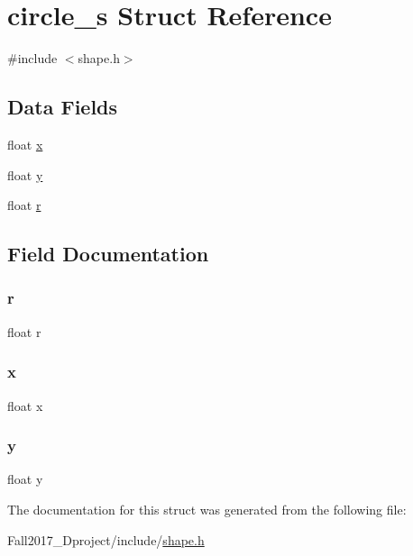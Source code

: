 \hypertarget{structcircle__s}{}\section{circle\+\_\+s Struct Reference}
\label{structcircle__s}


{\ttfamily \#include $<$shape.\+h$>$}

\subsection*{Data Fields}
\begin{DoxyCompactItemize}
\item 
float \hyperlink{structcircle__s_ad0da36b2558901e21e7a30f6c227a45e}{x}
\item 
float \hyperlink{structcircle__s_aa4f0d3eebc3c443f9be81bf48561a217}{y}
\item 
float \hyperlink{structcircle__s_a4788d82c901b9367dd5c0daff8a7616b}{r}
\end{DoxyCompactItemize}


\subsection{Field Documentation}
\mbox{\label{structcircle__s_a4788d82c901b9367dd5c0daff8a7616b}} 
\subsubsection{\texorpdfstring{r}{r}}
{\footnotesize\ttfamily float r}

\mbox{\label{structcircle__s_ad0da36b2558901e21e7a30f6c227a45e}} 
\subsubsection{\texorpdfstring{x}{x}}
{\footnotesize\ttfamily float x}

\mbox{\label{structcircle__s_aa4f0d3eebc3c443f9be81bf48561a217}} 
\subsubsection{\texorpdfstring{y}{y}}
{\footnotesize\ttfamily float y}



The documentation for this struct was generated from the following file\+:\begin{DoxyCompactItemize}
\item 
Fall2017\+\_\+Dproject/include/\hyperlink{shape_8h}{shape.\+h}\end{DoxyCompactItemize}
